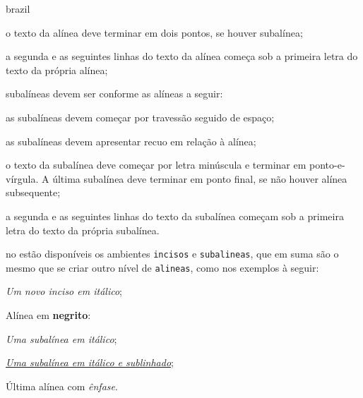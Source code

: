 \begin{otherlanguage*}{brazil}
\begin{alineas}
  \item o texto da alínea deve terminar em dois pontos, se houver subalínea;

  \item a segunda e as seguintes linhas do texto da alínea começa sob a
  primeira letra do texto da própria alínea;

  \item subalíneas \cite[4.3]{NBR6024:2012} devem ser conforme as alíneas a
  seguir:

  \begin{alineas}
     \item as subalíneas devem começar por travessão seguido de espaço;

     \item as subalíneas devem apresentar recuo em relação à alínea;

     \item o texto da subalínea deve começar por letra minúscula e terminar em
     ponto-e-vírgula. A última subalínea deve terminar em ponto final, se não
     houver alínea subsequente;

     \item a segunda e as seguintes linhas do texto da subalínea começam sob a
     primeira letra do texto da própria subalínea.
  \end{alineas}

  \item no \abnTeX{} estão disponíveis os ambientes \texttt{incisos} e
  \texttt{subalineas}, que em suma são o mesmo que se criar outro nível de
  \texttt{alineas}, como nos exemplos à seguir:

  \begin{incisos}
    \item \textit{Um novo inciso em itálico};
  \end{incisos}

  \item Alínea em \textbf{negrito}:

  \begin{subalineas}
    \item \textit{Uma subalínea em itálico};
    \item \underline{\textit{Uma subalínea em itálico e sublinhado}};
  \end{subalineas}

  \item Última alínea com \emph{ênfase}.

\end{alineas}


\end{otherlanguage*}

